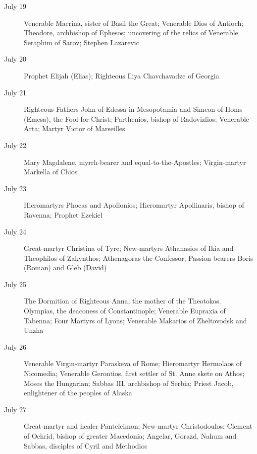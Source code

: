 \begin{description}
\item[July 19]

Venerable Macrina, sister of Basil the Great; Venerable Dios of Antioch; Theodore, archbishop of Ephesos; uncovering of the relics of Venerable Seraphim of Sarov; Stephen Lazarevic

\item[July 20]

Prophet Elijah (Elias); Righteous Iliya Chavchavadze of Georgia

\item[July 21]

Righteous Fathers John of Edessa in Mesopotamia and Simeon of Homs (Emesa), the Fool-for-Christ; Parthenios, bishop of Radovizlios; Venerable Arta; Martyr Victor of Marseilles

\item[July 22]

Mary Magdalene, myrrh-bearer and equal-to-the-Apostles; Virgin-martyr Markella of Chios

\item[July 23]

Hieromartyrs Phocas and Apollonios; Hieromartyr Apollinaris, bishop of Ravenna; Prophet Ezekiel

\item[July 24]

Great-martyr Christina of Tyre; New-martyrs Athanasios of Ikia and Theophilos of Zakynthos; Athenagoras the Confessor; Passion-bearers Boris (Roman) and Gleb (David)

\item[July 25]

The Dormition of Righteous Anna, the mother of the Theotokos. Olympias, the deaconess of Constantinople; Venerable Eupraxia of Tabenna; Four Martyrs of Lyons; Venerable Makarios of Zheltovodsk and Unzha

\item[July 26]

Venerable Virgin-martyr Paraskeva of Rome; Hieromartyr Hermolaos of Nicomedia; Venerable Gerontios, first settler of St. Anne skete on Athos; Moses the Hungarian; Sabbas III, archbishop of Serbia; Priest Jacob, enlightener of the peoples of Alaska

\item[July 27]

Great-martyr and healer Panteleimon; New-martyr Christodoulos; Clement of Ochrid, bishop of greater Macedonia; Angelar, Gorazd, Nahum and Sabbas, disciples of Cyril and Methodios


\end{description}
